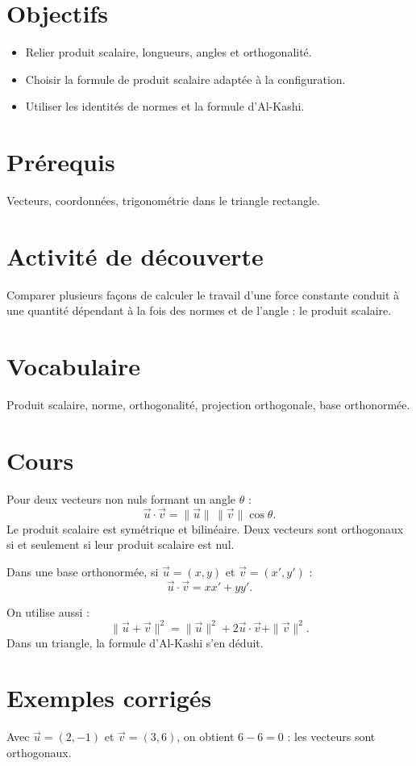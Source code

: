 \section{Objectifs}
\begin{itemize}
\item Relier produit scalaire, longueurs, angles et orthogonalité.
\item Choisir la formule de produit scalaire adaptée à la configuration.
\item Utiliser les identités de normes et la formule d’Al-Kashi.
\end{itemize}

\section{Prérequis}
Vecteurs, coordonnées, trigonométrie dans le triangle rectangle.

\section{Activité de découverte}
Comparer plusieurs façons de calculer le travail d’une force constante conduit à une quantité dépendant à la fois des normes et de l’angle : le produit scalaire.

\section{Vocabulaire}
Produit scalaire, norme, orthogonalité, projection orthogonale, base orthonormée.

\section{Cours}
Pour deux vecteurs non nuls formant un angle $\theta$ :
\[
\vec u\cdot\vec v=\|\vec u\|\,\|\vec v\|\cos\theta.
\]
Le produit scalaire est symétrique et bilinéaire. Deux vecteurs sont orthogonaux si et seulement si leur produit scalaire est nul.

Dans une base orthonormée, si $\vec u=(x,y)$ et $\vec v=(x',y')$ :
\[
\vec u\cdot\vec v=xx'+yy'.
\]

On utilise aussi :
\[
\|\vec u+\vec v\|^2=\|\vec u\|^2+2\vec u\cdot\vec v+\|\vec v\|^2.
\]
Dans un triangle, la formule d’Al-Kashi s’en déduit.

\section{Exemples corrigés}
Avec $\vec u=(2,-1)$ et $\vec v=(3,6)$, on obtient $6-6=0$ : les vecteurs sont orthogonaux.

